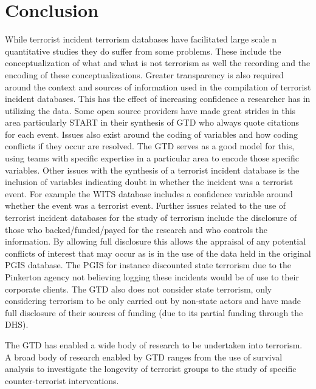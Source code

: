 \section{Conclusion}
While terrorist incident terrorism databases have facilitated large scale n quantitative studies they do suffer from some problems. These include the conceptualization of what and what is not terrorism as well the recording and the encoding of these conceptualizations.  Greater transparency is also required around the context and sources of information used in the compilation of terrorist incident databases. This has the effect of increasing confidence a researcher has in utilizing the data. Some open source providers have made great strides in this area particularly START in their synthesis of GTD who always quote citations for each event. Issues also exist around the coding of variables and how coding conflicts if they occur are resolved. The GTD serves as a good model for this, using teams with specific expertise in a particular area to encode those specific variables. Other issues with the synthesis of a terrorist incident database is the inclusion of variables indicating doubt in whether the incident was a terrorist event. For example the WITS database includes a confidence variable around whether the event was a terrorist event. Further issues related to the use of terrorist incident databases for the study of terrorism include the disclosure of those who backed/funded/payed for the research and who controls the information. By allowing full disclosure this allows the appraisal of any potential conflicts of interest that may occur as is in the use of the data held in the original PGIS database. The PGIS for instance discounted state terrorism due to the Pinkerton agency not believing logging these incidents would be of use to their corporate clients. The GTD also does not consider state terrorism, only considering terrorism to be only carried out by non-state actors and have made full disclosure of their sources of funding (due to its partial funding through the DHS).

The GTD has enabled a wide body of research to be undertaken into terrorism. A broad body of research enabled by GTD ranges from the use of survival analysis to investigate the longevity of terrorist groups to the study of specific counter-terrorist interventions.


 
